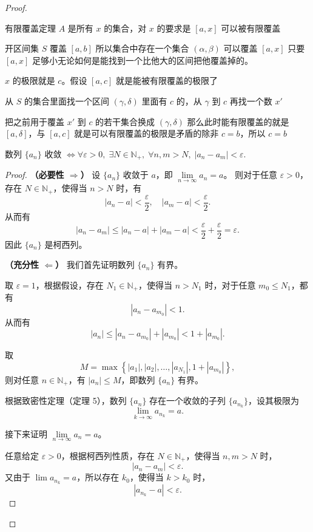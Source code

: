 \documentclass[lang=cn,10pt]{elegantbook}
\begin{document}
\begin{proof}
\begin{dxtips}{有限覆盖定理}
$A$ 是所有 $x$ 的集合，对 $x$ 的要求是 $[a,x]$ 可以被有限覆盖

开区间集 $S$ 覆盖 $[a,b]$ 所以集合中存在一个集合 $(\alpha,\beta)$ 可以覆盖 $[a,x]$ 只要 $[a,x]$ 足够小无论如何是能找到一个比他大的区间把他覆盖掉的。

$x$ 的极限就是 $c$。假设 $[a,c]$ 就是能被有限覆盖的极限了

从 $S$ 的集合里面找一个区间 $(\gamma ,\delta)$ 里面有 $c$ 的，从 $\gamma$ 到 $c$ 再找一个数 $x'$

把之前用于覆盖 $x'$ 到 $c$ 的若干集合换成 $(\gamma ,\delta)$ 那么此时能有限覆盖的就是 $[a,\delta]$，与 $[a,c]$ 就是可以有限覆盖的极限是矛盾的除非 $c=b$，所以 $c=b$
\end{dxtips}
\begin{theorem}[柯西收敛准则]
数列 $\{a_n\}$ 收敛 $\Longleftrightarrow \forall \varepsilon > 0,\; \exists N \in \mathbb{N}_+,\; \forall n, m > N,\; |a_n - a_m| < \varepsilon$.
\end{theorem}

\begin{proof}
\textbf{（必要性 $\Rightarrow$）}  
设 $\{a_n\}$ 收敛于 $a$，即 $\lim\limits_{n\to\infty} a_n = a$。  
则对于任意 $\varepsilon > 0$，存在 $N \in \mathbb{N}_+$，使得当 $n > N$ 时，有
\[
|a_n - a| < \frac{\varepsilon}{2},\quad |a_m - a| < \frac{\varepsilon}{2}.
\]
从而有
\[
|a_n - a_m| \leq |a_n - a| + |a_m - a| < \frac{\varepsilon}{2} + \frac{\varepsilon}{2} = \varepsilon.
\]
因此 $\{a_n\}$ 是柯西列。

\medskip

\textbf{（充分性 $\Leftarrow$）}  
我们首先证明数列 $\{a_n\}$ 有界。

取 $\varepsilon = 1$，根据假设，存在 $N_1 \in \mathbb{N}_+$，使得当 $n > N_1$ 时，对于任意 $m_0 \leq N_1$，都有
\[
|a_n - a_{m_0}| < 1.
\]
从而有
\[
|a_n| \leq |a_n - a_{m_0}| + |a_{m_0}| < 1 + |a_{m_0}|.
\]

取
\[
M = \max\left\{ |a_1|, |a_2|, \dots, |a_{N_1}|, 1 + |a_{m_0}| \right\},
\]
则对任意 $n \in \mathbb{N}_+$，有 $|a_n| \leq M$，即数列 $\{a_n\}$ 有界。

根据致密性定理（定理 5），数列 $\{a_n\}$ 存在一个收敛的子列 $\{a_{n_k}\}$，设其极限为
\[
\lim_{k \to \infty} a_{n_k} = a.
\]

接下来证明 $\lim\limits_{n\to\infty} a_n = a$。

任意给定 $\varepsilon > 0$，根据柯西列性质，存在 $N \in \mathbb{N}_+$，使得当 $n, m > N$ 时，
\[
|a_n - a_m| < \varepsilon.
\]
又由于 $\lim a_{n_k} = a$，所以存在 $k_0$，使得当 $k > k_0$ 时，
\[
|a_{n_k} - a| < \varepsilon.
\]


\end{proof}
\end{proof}
\end{document}

